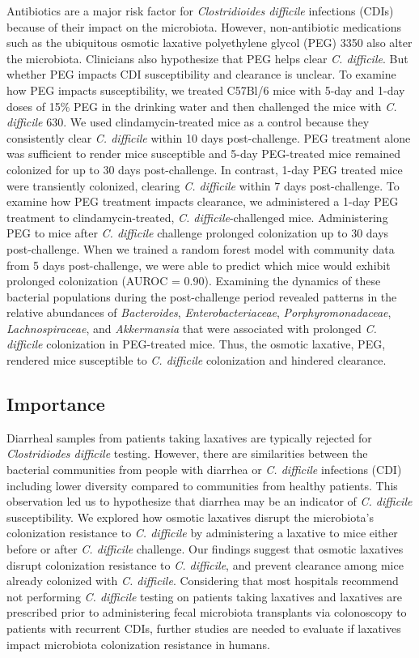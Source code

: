 \documentclass[
  11pt,
]{article}
\begin{document}
Antibiotics are a major risk factor for \emph{Clostridioides difficile}
infections (CDIs) because of their impact on the microbiota. However,
non-antibiotic medications such as the ubiquitous osmotic laxative
polyethylene glycol (PEG) 3350 also alter the microbiota. Clinicians
also hypothesize that PEG helps clear \emph{C. difficile}. But whether
PEG impacts CDI susceptibility and clearance is unclear. To examine how
PEG impacts susceptibility, we treated C57Bl/6 mice with 5-day and 1-day
doses of 15\% PEG in the drinking water and then challenged the mice
with \emph{C. difficile} 630. We used clindamycin-treated mice as a
control because they consistently clear \emph{C. difficile} within 10
days post-challenge. PEG treatment alone was sufficient to render mice
susceptible and 5-day PEG-treated mice remained colonized for up to 30
days post-challenge. In contrast, 1-day PEG treated mice were
transiently colonized, clearing \emph{C. difficile} within 7 days
post-challenge. To examine how PEG treatment impacts clearance, we
administered a 1-day PEG treatment to clindamycin-treated, \emph{C.
difficile}-challenged mice. Administering PEG to mice after \emph{C.
difficile} challenge prolonged colonization up to 30 days
post-challenge. When we trained a random forest model with community
data from 5 days post-challenge, we were able to predict which mice
would exhibit prolonged colonization (AUROC = 0.90). Examining the
dynamics of these bacterial populations during the post-challenge period
revealed patterns in the relative abundances of \emph{Bacteroides},
\emph{Enterobacteriaceae}, \emph{Porphyromonadaceae},
\emph{Lachnospiraceae}, and \emph{Akkermansia} that were associated with
prolonged \emph{C. difficile} colonization in PEG-treated mice. Thus,
the osmotic laxative, PEG, rendered mice susceptible to \emph{C.
difficile} colonization and hindered clearance.

\hypertarget{importance}{%
\subsection{Importance}\label{importance}}

Diarrheal samples from patients taking laxatives are typically rejected
for \emph{Clostridiodes difficile} testing. However, there are
similarities between the bacterial communities from people with diarrhea
or \emph{C. difficile} infections (CDI) including lower diversity
compared to communities from healthy patients. This observation led us
to hypothesize that diarrhea may be an indicator of \emph{C. difficile}
susceptibility. We explored how osmotic laxatives disrupt the
microbiota's colonization resistance to \emph{C. difficile} by
administering a laxative to mice either before or after \emph{C.
difficile} challenge. Our findings suggest that osmotic laxatives
disrupt colonization resistance to \emph{C. difficile}, and prevent
clearance among mice already colonized with \emph{C. difficile}.
Considering that most hospitals recommend not performing \emph{C.
difficile} testing on patients taking laxatives and laxatives are
prescribed prior to administering fecal microbiota transplants via
colonoscopy to patients with recurrent CDIs, further studies are needed
to evaluate if laxatives impact microbiota colonization resistance in
humans.
\end{document}
